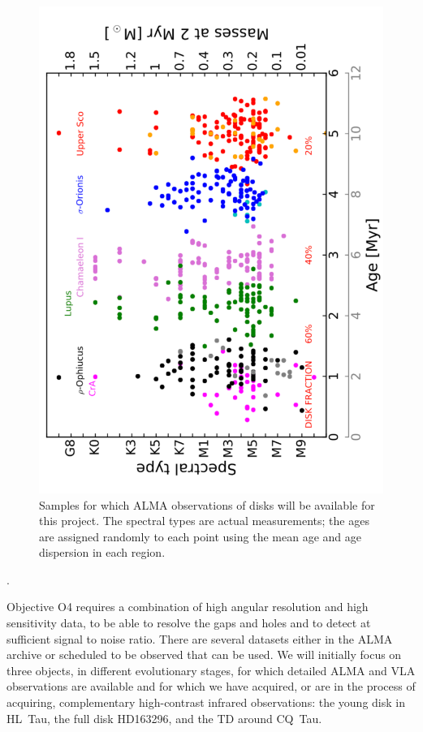 \documentclass[10pt,fleqn,twoside]{article}
\begin{document}
\begin{figure}
\centerline{\includegraphics[scale=0.4,angle=-90]{f_samples_alma.pdf}}
\caption{Samples for which ALMA observations of disks will be available for this project. The spectral types are actual measurements; the ages are assigned randomly to each point using the mean age and age dispersion in each region.}
\label{f_almasamp}
\end{figure}

\vspace{1em}{\Tcol\bf ALMA Data for objective O4}.

Objective O4 requires a combination of high angular resolution and high sensitivity data, to be able to resolve the gaps and holes and to detect at sufficient signal to noise ratio. There are several datasets either in the ALMA archive or scheduled to be observed that can be used. We will initially focus on three objects, in different evolutionary stages, for which detailed ALMA and VLA observations are available and for which we have acquired, or are in the process of acquiring, complementary high-contrast infrared observations: the young disk in HL~Tau, the full disk HD163296, and the TD around CQ~Tau.
\end{document}
